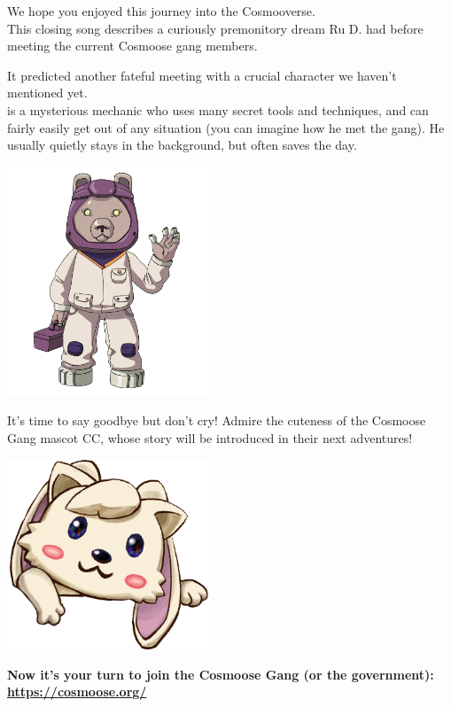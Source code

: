 We hope you enjoyed this journey into the Cosmooverse. \\

This closing song describes a curiously premonitory dream Ru D. had before meeting the current Cosmoose gang members. 

It predicted another fateful meeting with a crucial character we haven't mentioned yet.\\

 is a mysterious mechanic who uses many secret tools and techniques, and can fairly easily get out of any situation (you can imagine how he met the gang). He usually quietly stays in the background, but often saves the day.

\begin{center}
\includegraphics[width=0.45\textwidth]{Assets/wool}
\end{center}

\clearpage
{}

It's time to say goodbye but don't cry! 
Admire the cuteness of the Cosmoose Gang mascot CC, whose story will be introduced in their next adventures!

\begin{center}
\includegraphics[width=0.45\textwidth]{Assets/ccc}
\end{center}

\textbf{Now it's your turn to join the Cosmoose Gang (or the government):\\
\url{https://cosmoose.org/}}

\clearpage
